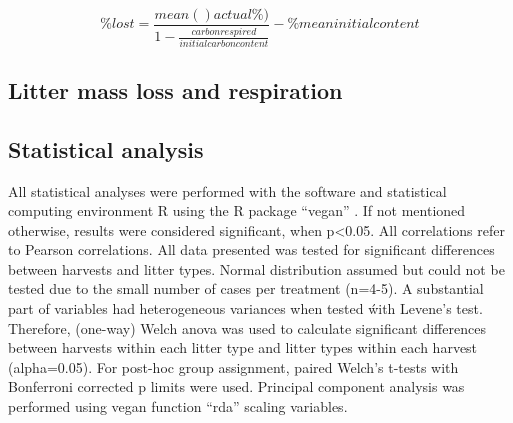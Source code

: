 \documentclass[preprint,review,12pt]{elsarticle}
\begin{document}
%
%
%
%

\begin{equation}
\% lost = \frac {mean()actual \%)} {1-\frac{carbon respired}{initial carbon content}} - \% mean initial content
\end{equation}

\subsection{Litter mass loss and respiration}

\subsection{Statistical analysis}
All statistical analyses were performed with the software and statistical computing environment R using the R package ``vegan'' \citep{Oksanen2011}. If not mentioned otherwise, results were considered significant, when p\textless 0.05. All correlations refer to Pearson correlations.
All data presented was tested for significant differences between harvests and litter types. Normal distribution assumed but could not be tested due to the small number of cases per treatment (n=4-5). A substantial part of variables had heterogeneous variances when tested ẃith Levene's test. Therefore, (one-way) Welch anova was used to calculate significant differences between harvests within each litter type and litter types within each harvest (alpha=0.05). For post-hoc group assignment, paired Welch's t-tests with Bonferroni corrected p limits were used. Principal component analysis was performed using vegan function ``rda'' scaling variables.
\end{document}
